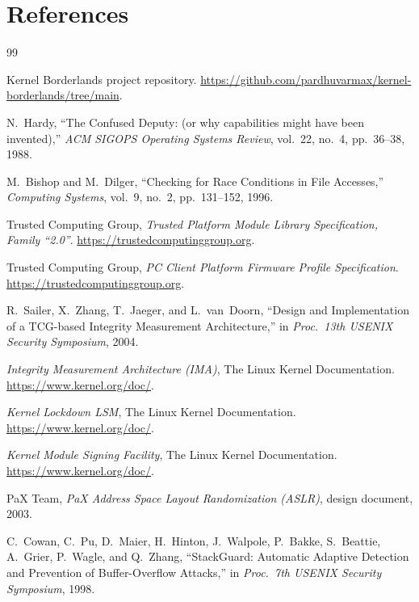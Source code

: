 \documentclass[11pt,a4paper]{article}
\begin{document}
\section{References}
\label{sec:references}

\renewcommand{\refname}{}
\begin{thebibliography}{99}

 Kernel Borderlands project repository. \url{https://github.com/pardhuvarmax/kernel-borderlands/tree/main}.

 N.~Hardy, ``The Confused Deputy: (or why capabilities might have been invented),'' \emph{ACM SIGOPS Operating Systems Review}, vol.~22, no.~4, pp.~36--38, 1988.

 M.~Bishop and M.~Dilger, ``Checking for Race Conditions in File Accesses,'' \emph{Computing Systems}, vol.~9, no.~2, pp.~131--152, 1996.

 Trusted Computing Group, \emph{Trusted Platform Module Library Specification, Family ``2.0''}. \url{https://trustedcomputinggroup.org}.

 Trusted Computing Group, \emph{PC Client Platform Firmware Profile Specification}. \url{https://trustedcomputinggroup.org}.

 R.~Sailer, X.~Zhang, T.~Jaeger, and L.~van~Doorn, ``Design and Implementation of a TCG-based Integrity Measurement Architecture,'' in \emph{Proc.\ 13th USENIX Security Symposium}, 2004.

 \emph{Integrity Measurement Architecture (IMA)}, The Linux Kernel Documentation. \url{https://www.kernel.org/doc/}.

 \emph{Kernel Lockdown LSM}, The Linux Kernel Documentation. \url{https://www.kernel.org/doc/}.

 \emph{Kernel Module Signing Facility}, The Linux Kernel Documentation. \url{https://www.kernel.org/doc/}.

 PaX Team, \emph{PaX Address Space Layout Randomization (ASLR)}, design document, 2003.

 C.~Cowan, C.~Pu, D.~Maier, H.~Hinton, J.~Walpole, P.~Bakke, S.~Beattie, A.~Grier, P.~Wagle, and Q.~Zhang, ``StackGuard: Automatic Adaptive Detection and Prevention of Buffer-Overflow Attacks,'' in \emph{Proc.\ 7th USENIX Security Symposium}, 1998.


\end{thebibliography}
\end{document}
